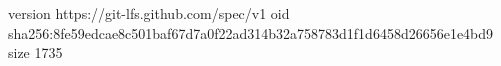 version https://git-lfs.github.com/spec/v1
oid sha256:8fe59edcae8c501baf67d7a0f22ad314b32a758783d1f1d6458d26656e1e4bd9
size 1735
